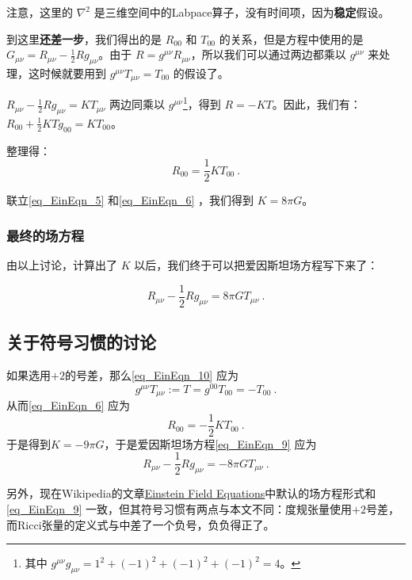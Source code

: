 注意，这里的 $\nabla^2$ 是三维空间中的Labpace算子，没有时间项，因为\textbf{稳定}假设。


到这里\textbf{还差一步}，我们得出的是 $R_{00}$ 和 $T_{00}$ 的关系，但是方程中使用的是 $G_{\mu\nu}=R_{\mu\nu}-\frac{1}{2}Rg_{\mu\nu}$。由于 $R=g^{\mu\nu}R_{\mu\nu}$，所以我们可以通过两边都乘以 $g^{\mu\nu}$ 来处理，这时候就要用到 $g^{\mu\nu}T_{\mu\nu}=T_{00}$ 的假设了。

$R_{\mu\nu}-\frac{1}{2}Rg_{\mu\nu}=KT_{\mu\nu}$ 两边同乘以 $g^{\mu\nu}$\footnote{其中 $g^{\mu\nu}g_{\mu\nu}=1^2+(-1)^2+(-1)^2+(-1)^2=4$。}，得到 $R=-KT$。因此，我们有：$R_{00}+\frac{1}{2}KTg_{00}=KT_{00}$。



整理得：
\begin{equation}\label{eq_EinEqn_6}
R_{00}=\frac{1}{2}KT_{00}~.
\end{equation}

联立\autoref{eq_EinEqn_5} 和\autoref{eq_EinEqn_6} ，我们得到 $K=8\pi G$。

\subsubsection{最终的场方程}

由以上讨论，计算出了 $K$ 以后，我们终于可以把爱因斯坦场方程写下来了：

\begin{equation}\label{eq_EinEqn_9}
R_{\mu\nu}-\frac{1}{2}Rg_{\mu\nu}=8\pi GT_{\mu\nu}~.
\end{equation}





\subsection{关于符号习惯的讨论}


如果选用$+2$的号差，那么\autoref{eq_EinEqn_10} 应为
\begin{equation}
g^{\mu\nu}T_{\mu\nu}:=T=g^{00}T_{00}=-T_{00}~.
\end{equation}
从而\autoref{eq_EinEqn_6}  应为
\begin{equation}
R_{00}=-\frac{1}{2}KT_{00}~.
\end{equation}
于是得到$K=-9\pi G$，于是爱因斯坦场方程\autoref{eq_EinEqn_9} 应为
\begin{equation}
R_{\mu\nu}-\frac{1}{2}Rg_{\mu\nu}=-8\pi GT_{\mu\nu}~.
\end{equation}

另外，现在Wikipedia的文章\href{https://en.wikipedia.org/wiki/Einstein_field_equations}{Einstein Field Equations}中默认的场方程形式和\autoref{eq_EinEqn_9} 一致，但其符号习惯有两点与本文不同：度规张量使用$+2$号差，而Ricci张量的定义式与中差了一个负号，负负得正了。











